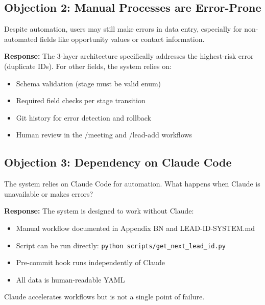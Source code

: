 \subsection{Objection 2: Manual Processes are Error-Prone}

\begin{tcolorbox}[colback=red!5!white, colframe=red!50!black,
    title=Objection: Human error in data entry]
Despite automation, users may still make errors in data entry, especially for non-automated fields like opportunity values or contact information.
\end{tcolorbox}

\textbf{Response:} The 3-layer architecture specifically addresses the highest-risk error (duplicate IDs). For other fields, the system relies on:
\begin{itemize}[nosep]
    \item Schema validation (stage must be valid enum)
    \item Required field checks per stage transition
    \item Git history for error detection and rollback
    \item Human review in the /meeting and /lead-add workflows
\end{itemize}

\subsection{Objection 3: Dependency on Claude Code}

\begin{tcolorbox}[colback=red!5!white, colframe=red!50!black,
    title=Objection: System requires AI assistant]
The system relies on Claude Code for automation. What happens when Claude is unavailable or makes errors?
\end{tcolorbox}

\textbf{Response:} The system is designed to work without Claude:
\begin{itemize}[nosep]
    \item Manual workflow documented in Appendix BN and LEAD-ID-SYSTEM.md
    \item Script can be run directly: \texttt{python scripts/get\_next\_lead\_id.py}
    \item Pre-commit hook runs independently of Claude
    \item All data is human-readable YAML
\end{itemize}
Claude accelerates workflows but is not a single point of failure.


